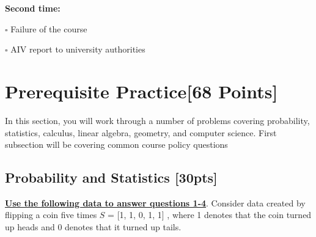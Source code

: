 \documentclass[12pt]{article}
\begin{document}
\begin{enumerate}
    
    \textbf{Second time:}
    \begin{list}{}
        \item $\square$ Failure of the course
        \item $\square$ AIV report to university authorities
    \end{list}

\end{enumerate}



\section{Prerequisite Practice[68 Points]}

In this section, you will work through a number of problems covering probability, statistics, calculus, linear algebra, geometry, and computer science. First subsection will be covering common course policy questions

\subsection{Probability and Statistics [30pts]}

\textbf{\underline{Use the following data to answer questions 1-4}}. Consider data created by flipping a coin five times $S $ = [1, 1, 0, 1, 1] , where 1 denotes that the coin turned up heads and 0 denotes that it turned up tails. \bigskip
\end{document}
